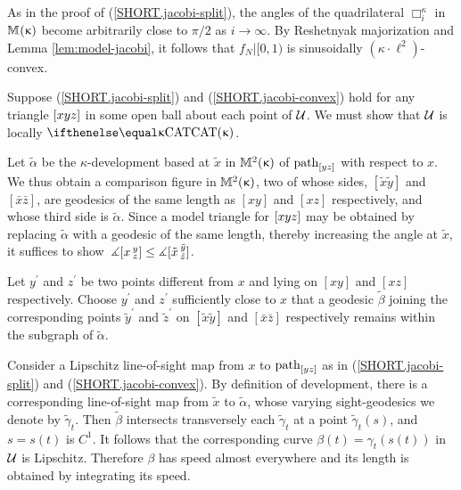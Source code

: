 {
As in the proof of (\ref{SHORT.jacobi-split}), the angles of the 
quadrilateral ${\Box}_i^\kappa$ in $\mathbb{M}_{{}}^{}({\upkappa})$ become arbitrarily close to $\pi/2$ as $i\to\infty$.   
By Reshetnyak majorization and Lemma \ref{lem:model-jacobi}, it follows that
$f_N|[0,1)$ is sinusoidally $(\kappa\cdot\ell^2)$-convex.  
\qeds

Suppose
 (\ref{SHORT.jacobi-split}) and (\ref{SHORT.jacobi-convex}) hold for any triangle $[{x}{y}{z}]$ in some open ball about each point of $\mathcal{U}$.
We must show that $\mathcal{U}$ is locally $\CAT\kappa$.

Let  $\tilde \alpha$ be  the $\kappa$-development based at $\tilde x$ in $\mathbb{M}_{{}}^{2}({\upkappa})$ of $\mathrm{path}_{[yz]}$ with respect to $x$.  We thus obtain a comparison figure in $\mathbb{M}_{{}}^{2}({\upkappa})$, two of whose sides, $[\tilde x\tilde y]$ and $[\bar x \bar z]$, are geodesics of the same length as $[xy]$ and $[xz]$ respectively, and whose third side is $\tilde \alpha$. Since a model triangle for $[{x}{y}{z}]$  may be obtained by replacing  $\tilde \alpha$ with a geodesic of the same length, thereby increasing the angle at $\tilde x$,  it suffices to show \,$\mangle\hinge {x}{y}
{z}\le\mangle\hinge {\tilde x}{\tilde y}{\tilde z}$.

Let $y^\prime$ and $z^\prime$ be two points  different from $x$ and lying on $[xy]$  and $[ x z]$  respectively.  Choose $y^\prime$ and $z^\prime$  sufficiently close to $x$ that a geodesic $\tilde \beta$ joining the corresponding points $\tilde  y^\prime$ and $\tilde  z^\prime$ on $[\tilde x\tilde y]$ and $[\bar x \bar z]$  respectively remains within the subgraph of $\tilde \alpha$. 

Consider a Lipschitz line-of-sight map from $x$ to $\mathrm{path}_{[yz]}$ as in (\ref{SHORT.jacobi-split}) and  (\ref{SHORT.jacobi-convex}). By  definition of development, there is a corresponding line-of-sight map from $\tilde x$ to $\tilde \alpha$, whose varying sight-geodesics we denote by $\tilde \gamma_t$.    Then $\tilde \beta$  intersects transversely each $\tilde \gamma_t$ at a point $\tilde \gamma_t(s)$, and $s=s(t)$ is $C^1$. It follows that the corresponding curve  $\beta(t)=\gamma_t(s(t))$   in $\mathcal{U}$ is Lipschitz. Therefore $\beta$ has speed almost everywhere  and its length is obtained by integrating its speed. 

}
